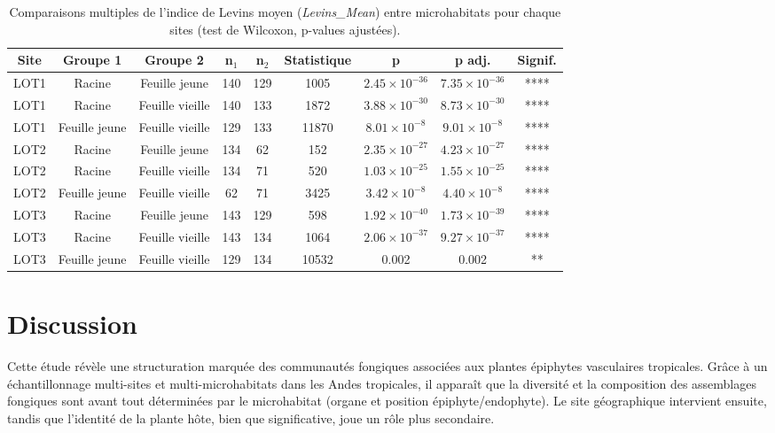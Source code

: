 \documentclass[a4paper,12pt]{article}
\begin{document}
\begin{table}[H]
    \centering
    {\footnotesize
    \caption{Comparaisons multiples de l'indice de Levins moyen (\textit{Levins\_Mean}) entre microhabitats pour chaque sites (test de Wilcoxon, p-values ajustées).}
    \label{tab:levins_pairwise}
    \renewcommand{\arraystretch}{1.2}
    \setlength{\tabcolsep}{6pt}
    \begin{tabular}{ccccccccc}
        \hline
        \textbf{Site} & \textbf{Groupe 1} & \textbf{Groupe 2} & \textbf{n$_1$} & \textbf{n$_2$} & \textbf{Statistique} & \textbf{p} & \textbf{p adj.} & \textbf{Signif.} \\
        \hline
        LOT1 & Racine & Feuille jeune & 140 & 129 & 1005 & $2.45\times 10^{-36}$ & $7.35\times 10^{-36}$ & **** \\
        LOT1 & Racine & Feuille vieille & 140 & 133 & 1872 & $3.88\times 10^{-30}$ & $8.73\times 10^{-30}$ & **** \\
        LOT1 & Feuille jeune & Feuille vieille & 129 & 133 & 11870 & $8.01\times 10^{-8}$ & $9.01\times 10^{-8}$ & **** \\
        LOT2 & Racine & Feuille jeune & 134 & 62 & 152 & $2.35\times 10^{-27}$ & $4.23\times 10^{-27}$ & **** \\
        LOT2 & Racine & Feuille vieille & 134 & 71 & 520 & $1.03\times 10^{-25}$ & $1.55\times 10^{-25}$ & **** \\
        LOT2 & Feuille jeune & Feuille vieille & 62 & 71 & 3425 & $3.42\times 10^{-8}$ & $4.40\times 10^{-8}$ & **** \\
        LOT3 & Racine & Feuille jeune & 143 & 129 & 598 & $1.92\times 10^{-40}$ & $1.73\times 10^{-39}$ & **** \\
        LOT3 & Racine & Feuille vieille & 143 & 134 & 1064 & $2.06\times 10^{-37}$ & $9.27\times 10^{-37}$ & **** \\
        LOT3 & Feuille jeune & Feuille vieille & 129 & 134 & 10532 & 0.002 & 0.002 & ** \\
        \hline
    \end{tabular}
    }
\end{table}

\section{Discussion}
Cette étude révèle une structuration marquée des communautés fongiques associées aux plantes épiphytes vasculaires tropicales. Grâce à un échantillonnage multi-sites et multi-microhabitats dans les Andes tropicales, il apparaît que la diversité et la composition des assemblages fongiques sont avant tout déterminées par le microhabitat (organe et position épiphyte/endophyte). Le site géographique intervient ensuite, tandis que l’identité de la plante hôte, bien que significative, joue un rôle plus secondaire.
\end{document}
